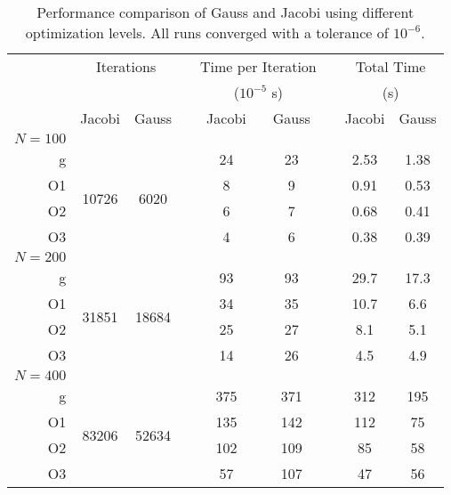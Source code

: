 \newcommand{\mct}[1]{\multicolumn{2}{c}{#1}}
\newcommand{\pht}{\phantom{a}}
\newcommand{\mrt}[1]{\multirow{4}{*}{#1}}
\begin{table}[H]
\caption{Performance comparison of Gauss and Jacobi using different
optimization levels. All runs converged with a tolerance of
$10^{-6}$.}
\label{tab:performance}
\centering
\begin{tabular}{@{}r cc c cc c cc @{}}
    \toprule
    & \mct{Iterations} & \pht & \mct{Time per Iteration} & \pht & \mct{Total Time}\\
    &         &        & \pht & \mct{($10^{-5}$ s)}        & \pht & \mct{(s)}       \\
    \cmidrule{2-3} \cmidrule{5-6} \cmidrule {8-9}
     & Jacobi & Gauss && Jacobi & Gauss && Jacobi & Gauss\\
    \midrule

$N = 100$\\
     g & \mrt{10726} & \mrt{6020} && 24 & 23 &&  2.53 &  1.38 \\
    O1 &  &  && 8 & 9 &&  0.91 &  0.53 \\
    O2 &  &  && 6 & 7 &&  0.68 &  0.41 \\
    O3 &  &  && 4 & 6 &&  0.38 &  0.39 \\
$N = 200$\\
     g & \mrt{31851} & \mrt{18684} && 93 & 93 &&  29.7 &  17.3 \\
    O1 &  &  && 34 & 35 &&  10.7 &   6.6 \\
    O2 &  &  && 25 & 27 &&   8.1 &   5.1 \\
    O3 &  &  && 14 & 26 &&   4.5 &   4.9 \\
$N = 400$\\
     g & \mrt{83206} & \mrt{52634} && 375 & 371 &&   312 &   195 \\
    O1 &  &  && 135 & 142 &&   112 &    75 \\
    O2 &  &  && 102 & 109 &&    85 &    58 \\
    O3 &  &  && 57 & 107 &&    47 &    56 \\

    \bottomrule
\end{tabular}
\end{table}